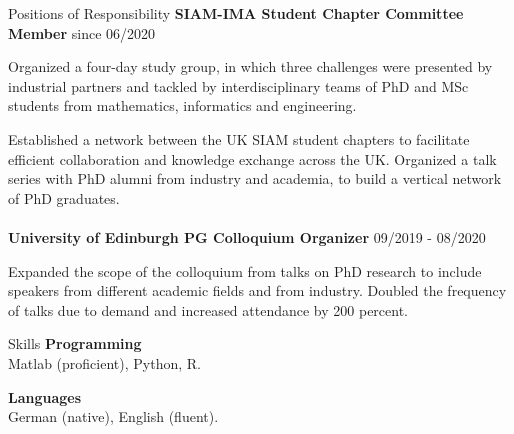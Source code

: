 \documentclass{resume} %
\begin{document}
\begin{rSection}{Positions of Responsibility}
{\bf SIAM-IMA Student Chapter Committee Member} \hfill{since 06/2020}

Organized a four-day study group, in which three challenges were presented by industrial partners and tackled by interdisciplinary teams of PhD and MSc students from mathematics, informatics and engineering. 

Established a network between the UK SIAM student chapters to facilitate efficient collaboration and knowledge exchange across the UK. Organized a talk series with PhD alumni from industry and academia, to build a vertical network of PhD graduates. 
\\
\\
{\bf University of Edinburgh PG Colloquium Organizer} \hfill{09/2019 - 08/2020}

Expanded the scope of the colloquium from talks on PhD research to include speakers from different academic fields and from industry. Doubled the frequency of talks due to demand and increased attendance by 200 percent.
\end{rSection}

\begin{rSection}{Skills}
{\bf Programming}\\
Matlab (proficient), Python, R.

{\bf Languages}\\
German (native), English (fluent). 
\end{rSection}
\end{document}
